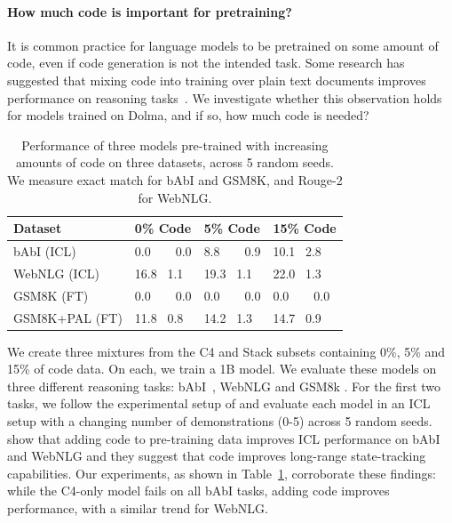 \documentclass{article}
\newcommand{\dolma}{Dolma\xspace}
\begin{document}
\paragraph{How much code is important for pretraining?} It is common practice for language models to be pretrained on some amount of code, even if code generation is not the intended task.
Some research has suggested that mixing code into training over plain text documents improves performance on reasoning tasks~\citep{madaan-etal-2022-language}.
We investigate whether this observation holds for models trained on \dolma, and if so, how much code is needed?

\begin{table}[h]
    \centering
   
    \small
    \begin{tabular}{llll}
        \toprule
        \textbf{Dataset} & \textbf{0\% Code} & \textbf{5\% Code} & \textbf{15\% Code} \\
        \midrule
	bAbI (ICL) & 0.0~~~\textpm~0.0 & 8.8~~~\textpm~0.9 & 10.1 \textpm~2.8 \\
	WebNLG (ICL) & 16.8 \textpm~1.1 & 19.3 \textpm~1.1 & 22.0 \textpm~1.3 \\
	GSM8K (FT) & 0.0~~~\textpm~0.0 & 0.0~~~\textpm~0.0 & 0.0~~~\textpm~0.0 \\
	GSM8K+PAL (FT) & 11.8 \textpm~0.8 & 14.2 \textpm~1.3 & 14.7 \textpm~0.9 \\
    \bottomrule
    
    \end{tabular}
    \caption{
    Performance of three models pre-trained with increasing amounts of code on three datasets, across 5 random seeds. 
    We measure exact match for bAbI and GSM8K, and Rouge-2 for WebNLG.
    }
    \label{tab:code-reasoning}
\end{table}

We create three mixtures from the C4 and Stack subsets containing 0\%, 5\% and 15\% of code data.
On each, we train a 1B model. 
We evaluate these models on three different reasoning tasks: bAbI~\citep{Weston2015TowardsAQ}, WebNLG \cite{gardent-etal-2017-creating} and GSM8k \cite{Cobbe2021TrainingVT}. For the first two tasks, we follow the experimental setup of \citet{muennighoff2023scaling} and evaluate each model in an ICL setup with a changing number of demonstrations (0-5) across 5 random seeds. \citet{muennighoff2023scaling} show that adding code to pre-training data improves ICL performance on bAbI and WebNLG and they suggest that code improves long-range state-tracking capabilities. Our experiments, as shown in Table~\ref{tab:code-reasoning}, corroborate these findings: while the C4-only model fails on all bAbI tasks, adding code improves performance, with a similar trend for WebNLG. 
\end{document}
